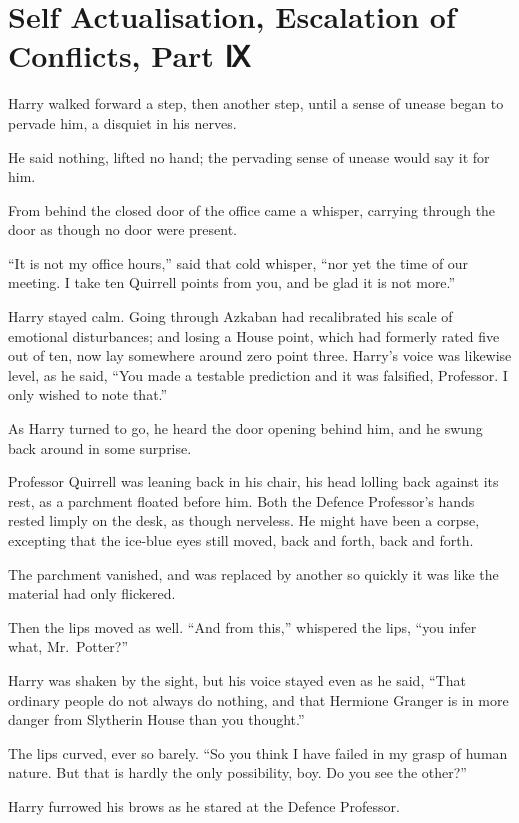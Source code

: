 \chapter{Self Actualisation, Escalation of Conflicts, Part Ⅸ}

Harry walked forward a step, then another step, until a sense of unease
began to pervade him, a disquiet in his nerves.

He said nothing, lifted no hand; the pervading sense of unease would say
it for him.

From behind the closed door of the office came a whisper, carrying
through the door as though no door were present.

``It is not my office hours,'' said that cold whisper, ``nor yet the
time of our meeting. I take ten Quirrell points from you, and be glad it
is not more.''

Harry stayed calm. Going through Azkaban had recalibrated his scale of
emotional disturbances; and losing a House point, which had formerly
rated five out of ten, now lay somewhere around zero point three.
Harry's voice was likewise level, as he said, ``You made a testable
prediction and it was falsified, Professor. I only wished to note
that.''

As Harry turned to go, he heard the door opening behind him, and he
swung back around in some surprise.

Professor Quirrell was leaning back in his chair, his head lolling back
against its rest, as a parchment floated before him. Both the Defence
Professor's hands rested limply on the desk, as though nerveless. He
might have been a corpse, excepting that the ice-blue eyes still moved,
back and forth, back and forth.

The parchment vanished, and was replaced by another so quickly it was
like the material had only flickered.

Then the lips moved as well. ``And from this,'' whispered the lips,
``you infer what, Mr.~Potter?''

Harry was shaken by the sight, but his voice stayed even as he said,
``That ordinary people do not always do nothing, and that Hermione
Granger is in more danger from Slytherin House than you thought.''

The lips curved, ever so barely. ``So you think I have failed in my
grasp of human nature. But that is hardly the only possibility, boy. Do
you see the other?''

Harry furrowed his brows as he stared at the Defence Professor.

